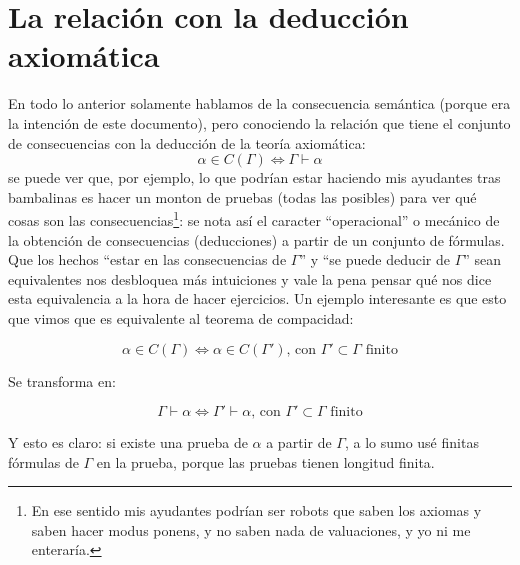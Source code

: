 \documentclass[10pt,a4paper]{article}
\newcommand{\G}{\Gamma}
\renewcommand{\a}{\alpha}
\begin{document}
\vspace{10px}
\section*{La relación con la deducción axiomática}
En todo lo anterior solamente hablamos de la consecuencia semántica (porque era la intención de este documento), pero conociendo la relación que tiene el conjunto de consecuencias con la deducción de la teoría axiomática: \[ \a \in C(\G) \iff \G \vdash \a \] se puede ver que, por ejemplo, lo que podrían estar haciendo mis ayudantes tras bambalinas es hacer un monton de pruebas (todas las posibles) para ver qué cosas son las consecuencias\footnote{En ese sentido mis ayudantes podrían ser robots que saben los axiomas y saben hacer modus ponens, y no saben nada de valuaciones, y yo ni me enteraría.}: se nota así el caracter ``operacional'' o mecánico de la obtención de consecuencias (deducciones) a partir de un conjunto de fórmulas. \\

Que los hechos ``estar en las consecuencias de $\G$'' y ``se puede deducir de $\G$''  sean equivalentes nos desbloquea más intuiciones y vale la pena pensar qué nos dice esta equivalencia a la hora de hacer ejercicios. Un ejemplo interesante es que esto que vimos que es equivalente al teorema de compacidad:

\[ \a \in C(\G) \iff \a \in C(\G')\text{, con $\G' \subset \G$ finito} \]

Se transforma en: 

\[ \G \vdash \a \iff \G' \vdash \a \text{, con $\G' \subset \G$ finito} \]

Y esto es claro: si existe una prueba de $\a$ a partir de $\G$, a lo sumo usé finitas fórmulas de $\G$ en la prueba, porque las pruebas tienen longitud finita.
\end{document}
